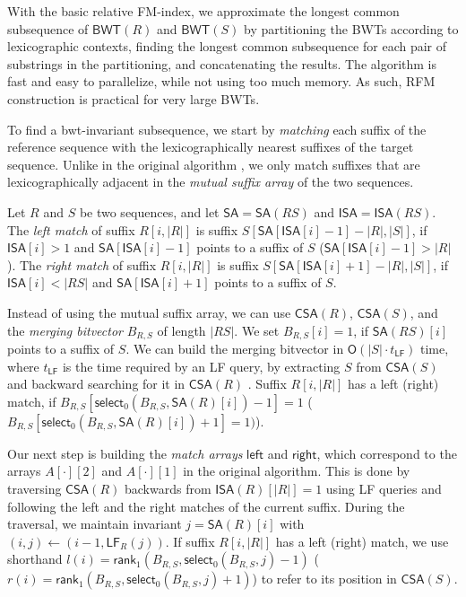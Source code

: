 \documentclass[a4paper,11pt]{llncs}
\newcommand{\abs}[1]{\ensuremath{\lvert #1 \rvert}}
\newcommand{\BWT}{\textsf{BWT}}
\newcommand{\RFM}{\textsf{RFM}}
\newcommand{\mSA}{\ensuremath{\mathsf{SA}}}
\newcommand{\mISA}{\ensuremath{\mathsf{ISA}}}
\newcommand{\mBWT}{\ensuremath{\mathsf{BWT}}}
\newcommand{\mCSA}{\ensuremath{\mathsf{CSA}}}
\newcommand{\mleft}{\ensuremath{\mathsf{left}}}
\newcommand{\mright}{\ensuremath{\mathsf{right}}}
\newcommand{\LF}{\textsf{LF}}
\newcommand{\mLF}{\ensuremath{\mathsf{LF}}}
\newcommand{\mrank}{\ensuremath{\mathsf{rank}}}
\newcommand{\mselect}{\ensuremath{\mathsf{select}}}
\newcommand{\Oh}{\ensuremath{\mathsf{O}}}
\begin{document}
With the basic relative FM-index, we approximate the longest common subsequence of $\mBWT(R)$ and $\mBWT(S)$ by partitioning the \BWT{}s according to lexicographic contexts, finding the longest common subsequence for each pair of substrings in the partitioning, and concatenating the results. The algorithm is fast and easy to parallelize, while not using too much memory. As such, \RFM{} construction is practical for very large \BWT{}s.

To find a bwt-invariant subsequence, we start by \emph{matching} each suffix of the reference sequence with the lexicographically nearest suffixes of the target sequence. Unlike in the original algorithm \cite{Belazzougui2014}, we only match suffixes that are lexicographically adjacent in the \emph{mutual suffix array} of the two sequences.

\begin{definition}
Let $R$ and $S$ be two sequences, and let $\mSA = \mSA(RS)$ and $\mISA = \mISA(RS)$. The \emph{left match} of suffix $R[i,\abs{R}]$ is suffix $S[\mSA[\mISA[i]-1] - \abs{R}, \abs{S}]$, if $\mISA[i] > 1$ and $\mSA[\mISA[i]-1]$ points to a suffix of $S$ ($\mSA[\mISA[i]-1] > \abs{R}$). The \emph{right match} of suffix $R[i,\abs{R}]$ is suffix $S[\mSA[\mISA[i]+1] - \abs{R}, \abs{S}]$, if $\mISA[i] < \abs{RS}$ and $\mSA[\mISA[i]+1]$ points to a suffix of $S$.
\end{definition}

Instead of using the mutual suffix array, we can use $\mCSA(R)$, $\mCSA(S)$, and the \emph{merging bitvector} $B_{R,S}$ of length $\abs{RS}$. We set $B_{R,S}[i] = 1$, if $\mSA(RS)[i]$ points to a suffix of $S$. We can build the merging bitvector in $\Oh(\abs{S} \cdot t_{\mLF})$ time, where $t_{\mLF}$ is the time required by an \LF{} query, by extracting $S$ from $\mCSA(S)$ and backward searching for it in $\mCSA(R)$ \cite{Siren2009}. Suffix $R[i,\abs{R}]$ has a left (right) match, if $B_{R,S}[\mselect_{0}(B_{R,S}, \mSA(R)[i])-1] = 1$ ($B_{R,S}[\mselect_{0}(B_{R,S}, \mSA(R)[i])+1] = 1)$).

Our next step is building the \emph{match arrays} $\mleft$ and $\mright$, which correspond to the arrays $A[\cdot][2]$ and $A[\cdot][1]$ in the original algorithm. This is done by traversing $\mCSA(R)$ backwards from $\mISA(R)[\abs{R}] = 1$ using \LF{} queries and following the left and the right matches of the current suffix. During the traversal, we maintain invariant $j = \mSA(R)[i]$ with $(i,j) \leftarrow (i-1, \mLF_{R}(j))$. If suffix $R[i,\abs{R}]$ has a left (right) match, we use shorthand $l(i) = \mrank_{1}(B_{R,S}, \mselect_{0}(B_{R,S}, j)-1)$ ($r(i) = \mrank_{1}(B_{R,S}, \mselect_{0}(B_{R,S}, j)+1)$) to refer to its position in $\mCSA(S)$.
\end{document}
